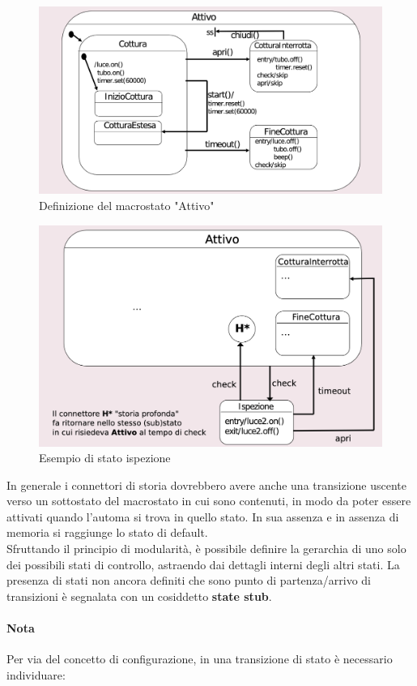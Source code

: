 \begin{figure}[h!]
    \centering
    \includegraphics[width=0.75\linewidth]{assets/UML/state/state6.png}
    \caption{Definizione del macrostato "Attivo"}
\end{figure}

\begin{figure}[h!]
    \centering
    \includegraphics[width=0.75\linewidth]{assets/UML/state/state7.png}
    \caption{Esempio di stato ispezione}
\end{figure}

In generale i connettori di storia dovrebbero avere anche una transizione uscente verso un sottostato del macrostato in cui sono contenuti, in modo da poter essere attivati quando l'automa si trova in quello stato. In sua assenza e in assenza di memoria si raggiunge lo stato di default.\\

Sfruttando il principio di modularità, è possibile definire la gerarchia di uno solo dei possibili stati di controllo, astraendo dai dettagli interni degli altri stati. La presenza di stati non ancora definiti che sono punto di partenza/arrivo di transizioni è segnalata con un cosiddetto \textbf{state stub}.

\paragraph{Nota} Per via del concetto di configurazione, in una transizione di stato è necessario individuare:


